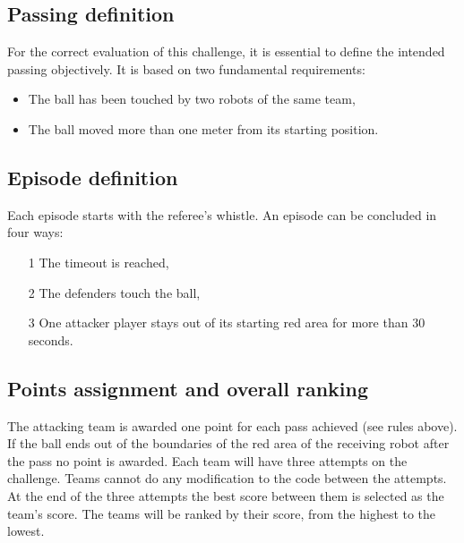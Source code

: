 \subsection{Passing definition}
For the correct evaluation of this challenge, it is essential to define the intended passing objectively. It is based on two fundamental requirements:
\begin{itemize}
    \item The ball has been touched by two robots of the same team,
    \item The ball moved more than one meter from its starting position.
\end{itemize}


\subsection{Episode definition}
Each episode starts with the referee's whistle. An episode can be concluded in four ways: 
\begin{itemize}
    \item[1] The timeout is reached,
    \item[2] The defenders touch the ball,
    \item[3] One attacker player stays out of its starting red area for more than 30 seconds.

\end{itemize}

\subsection{Points assignment and overall ranking}
The attacking team is awarded one point for each pass achieved (see rules above). If the ball ends out of the boundaries of the red area of the receiving robot after the pass no point is awarded. Each team will have three attempts on the challenge. Teams cannot do any modification to the code between the attempts. At the end of the three attempts the best score between them is selected as the team's score. The teams will be ranked by their score, from the highest to the lowest. 

